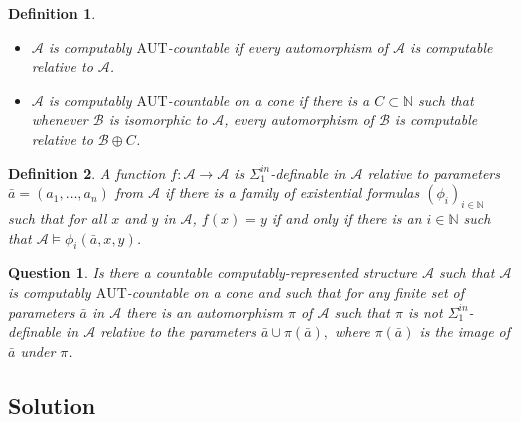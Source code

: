 \documentclass[12pt]{article}
\newcommand{\A}{\mathcal{A}}
\newcommand{\B}{\mathcal{B}}
\newcommand{\N}{\mathbb{N}}
\newcommand{\AUT}{\mathrm{AUT}}
\newtheorem{definition}{Definition}
\newtheorem{question}{Question}
\begin{document}
\begin{definition}\label{1.1}
  \begin{itemize}
  \item     $\A$ is \emph{computably $\AUT$-countable} if every automorphism of $\A$ is computable relative to $\A$.  
  \item  $\A$ is \emph{computably $\AUT$-countable on a cone} if there is a $C\subset\N$ such that whenever $\B$ is isomorphic to $\A$, every automorphism of $\B$ is computable relative to $\B\oplus C$.
  \end{itemize}
\end{definition}


\begin{definition}
  A function $f:\A\to\A$ is \emph{$\Sigma^{in}_1$-definable} in $\A$ relative to parameters
  $\bar{a}=(a_1,\dots,a_n)$ from $\A$ if there is a family of existential formulas $(\phi_i)_{i\in\N}$ such that for all $x$ and $y$ in $\A$, $f(x)=y$ if and only if there is an $i\in\N$ such that $\A\models\phi_i(\bar{a},x,y)$.
\end{definition}

\begin{question}\label{sec:question}\label{1.2}
  Is there a countable computably-represented structure $\A$ such that $\A$ is computably $\AUT$-countable on a cone and such that for any finite  set of parameters $\bar{a}$ in $\A$ there is an automorphism $\pi$ of $\A$ such that $\pi$ is not $\Sigma^{in}_1$-definable in $\A$ relative to the parameters $\bar{a}\cup \pi(\bar{a}),$ where $\pi(\bar{a})$ is the image of $\bar{a}$ under $\pi$.
\end{question}

\subsection*{Solution}
\end{document}

